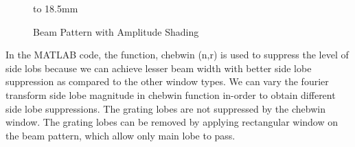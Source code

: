 \begin{figure}[h]
\centering
{}
\newline
\hbox to 18.5mm{}%
\caption{ Beam Pattern with Amplitude Shading }
\end{figure}

\newpage

\noindent In the MATLAB code, the function, chebwin (n,r) is used to suppress the level of side lobs because we can achieve lesser beam width with better side lobe suppression as compared to the other window types. We can vary the fourier transform side lobe magnitude in chebwin function in-order to obtain different side lobe suppressions. The grating lobes are not suppressed by the chebwin window. The grating lobes can be removed by applying rectangular window on the beam pattern, which allow only main lobe to pass.

